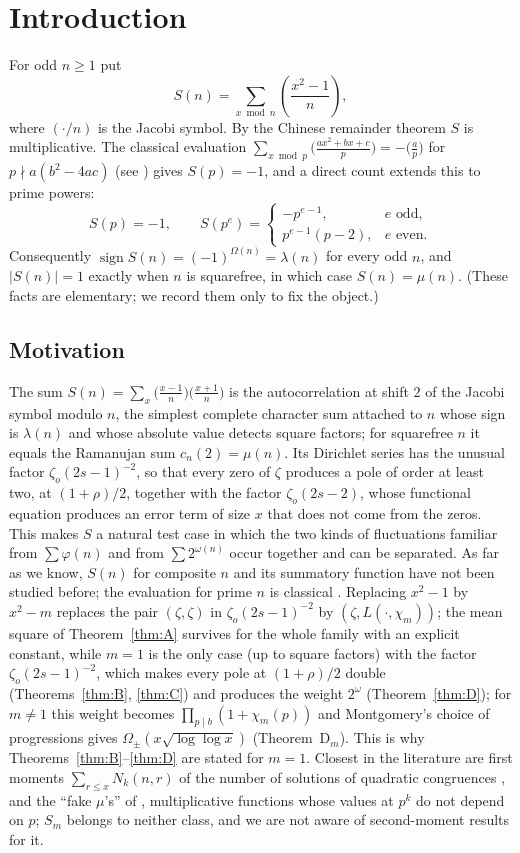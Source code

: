 \documentclass[11pt]{amsart}
\theoremstyle{remark}
\newcommand{\zo}{\zeta_{o}}
\newcommand{\jac}[2]{\left(\frac{#1}{#2}\right)}
\begin{document}
\section{Introduction}

For odd $n\ge1$ put
\[
S(n)=\sum_{x\bmod n}\jac{x^2-1}{n},
\]
where $(\cdot/n)$ is the Jacobi symbol. By the Chinese remainder theorem $S$ is multiplicative. The classical evaluation $\sum_{x\bmod p}\big(\frac{ax^2+bx+c}{p}\big)=-\big(\frac ap\big)$ for $p\nmid a(b^2-4ac)$ (see \cite{BEW}) gives $S(p)=-1$, and a direct count extends this to prime powers:
\begin{equation}\label{eq:local}
S(p)=-1,\qquad S(p^e)=\begin{cases}-p^{e-1},& e\text{ odd},\\ p^{e-1}(p-2),& e\text{ even}.\end{cases}
\end{equation}
Consequently $\operatorname{sign}S(n)=(-1)^{\Omega(n)}=\lambda(n)$ for every odd $n$, and $|S(n)|=1$ exactly when $n$ is squarefree, in which case $S(n)=\mu(n)$. (These facts are elementary; we record them only to fix the object.)

\subsection*{Motivation}
The sum $S(n)=\sum_x\big(\frac{x-1}{n}\big)\big(\frac{x+1}{n}\big)$ is the autocorrelation at shift $2$ of the Jacobi symbol modulo $n$, the simplest complete character sum attached to $n$ whose sign is $\lambda(n)$ and whose absolute value detects square factors; for squarefree $n$ it equals the Ramanujan sum $c_n(2)=\mu(n)$. Its Dirichlet series has the unusual factor $\zo(2s-1)^{-2}$, so that every zero of $\zeta$ produces a pole of order at least two, at $(1+\rho)/2$, together with the factor $\zo(2s-2)$, whose functional equation produces an error term of size $x$ that does not come from the zeros. This makes $S$ a natural test case in which the two kinds of fluctuations familiar from $\sum\varphi(n)$ \cite{Ch,PC,ES} and from $\sum2^{\omega(n)}$ \cite{KW09} occur together and can be separated. As far as we know, $S(n)$ for composite $n$ and its summatory function have not been studied before; the evaluation for prime $n$ is classical \cite{BEW}. Replacing $x^2-1$ by $x^2-m$ replaces the pair $(\zeta,\zeta)$ in $\zo(2s-1)^{-2}$ by $(\zeta,L(\cdot,\chi_m))$; the mean square of Theorem~\ref{thm:A} survives for the whole family with an explicit constant, while $m=1$ is the only case (up to square factors) with the factor $\zo(2s-1)^{-2}$, which makes every pole at $(1+\rho)/2$ double (Theorems~\ref{thm:B}, \ref{thm:C}) and produces the weight $2^{\omega}$ (Theorem~\ref{thm:D}); for $m\neq1$ this weight becomes $\prod_{p\mid b}(1+\chi_m(p))$ and Montgomery's choice of progressions gives $\Omega_\pm(x\sqrt{\log\log x})$ (Theorem~D$_m$). This is why Theorems~\ref{thm:B}--\ref{thm:D} are stated for $m=1$. Closest in the literature are first moments $\sum_{r\le x}N_k(n,r)$ of the number of solutions of quadratic congruences \cite{To}, and the ``fake $\mu$'s'' of \cite{MY}, multiplicative functions whose values at $p^k$ do not depend on $p$; $S_m$ belongs to neither class, and we are not aware of second-moment results for it.
\end{document}
